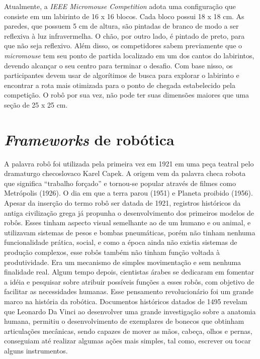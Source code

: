 \hspace{0.5cm} Atualmente, a \textit{IEEE Micromouse Competition} adota uma configuração que consiste em um labirinto de 16 x 16 blocos. Cada bloco possui 18 x 18 cm. As paredes, que possuem 5 cm de altura, são pintadas de branco de modo a ser reflexiva à luz infravermelha. O chão, por outro lado, é pintado de preto, para que não seja reflexivo. Além disso, os competidores sabem previamente que o \textit{micromouse} tem seu ponto de partida localizado em um dos cantos do labirintos, devendo alcançar o seu centro para terminar o desafio. Com base nisso, os participantes devem usar de algorítimos de busca para explorar o labirinto e encontrar a rota mais otimizada para o ponto de chegada estabelecido pela competição. O robô por sua vez, não pode ter suas dimensões maiores que uma seção de 25 x 25 cm. 

\section{\textit{Frameworks} de robótica}
\label{sec:robotic_frameworks}
A palavra robô foi utilizada pela primeira vez em 1921 em uma peça teatral pelo dramaturgo checoslovaco Karel Capek. A origem vem da palavra checa robota que significa “trabalho forçado” e tornou-se popular através de filmes como Metrópolis (1926). O dia em que a terra parou (1951) e Planeta proibido (1956). Apesar da inserção do termo robô ser datada de 1921, registros históricos da antiga civilização grega já propunha o desenvolvimento dos primeiros modelos de robôs. Esses tinham aspecto visual semelhante ao de um humano e ou animal, e utilizavam sistemas de pesos e bombas pneumáticas, porém não tinham nenhuma funcionalidade prática, social, e como a época ainda não existia sistemas de produção complexos, esse robôs também não tinham função voltada à produtividade. Era um mecanismo de simples movimentação e sem nenhuma finalidade real. Algum tempo depois, cientistas árabes se dedicaram em fomentar a idéia e pesquisar sobre atribuir possíveis funções a esses robôs, com objetivo de facilitar as necessidades humanas. Esse pensamento revolucionário foi um grande marco na história da robótica. Documentos históricos datados de 1495 revelam que Leonardo Da Vinci ao desenvolver uma grande investigação sobre a anatomia humana, permitiu o desenvolvimento de exemplares de bonecos que obtinham articulações mecânicas, sendo capazes de mover as mãos, cabeça, olhos e pernas, conseguiam até realizar algumas ações mais simples, tal como, escrever ou tocar alguns instrumentos.

